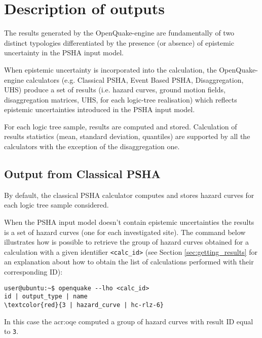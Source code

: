 \section{Description of outputs}
The results generated by the OpenQuake-engine are fundamentally 
of two distinct typologies differentiated by the presence (or 
absence) of epistemic uncertainty in the PSHA input model.

When epistemic uncertainty is incorporated into the 
calculation, the Open\-Quake\--engine calculators (e.g. Classical 
PSHA, Event Based PSHA, Disaggregation, UHS) produce a 
set of results (i.e. hazard curves, ground motion fields, 
disaggregation matrices, UHS, for each logic-tree realisation) 
which reflects epistemic 
uncertainties introduced in the PSHA input model.

For each logic tree sample, results are computed and stored. 
Calculation of results statistics (mean, standard deviation, 
quantiles) are supported by all the calculators with the exception 
of the disaggregation one.
\subsection{Output from Classical PSHA}
By default, the classical PSHA calculator computes and stores 
hazard curves for each logic tree sample considered.

When the PSHA input model doesn't contain epistemic uncertainties
the results is a set of hazard curves (one for each 
investigated site). 
The command below illustrates how is possible to retrieve the group
of hazard curves obtained for a calculation with a given
identifier \texttt{<calc\_id>} (see Section \ref{sec:getting_results}
for an explanation about how to obtain the list of calculations 
performed with their corresponding ID):
\begin{Verbatim}[frame=single, commandchars=\\\{\}, fontsize=\small]
user@ubuntu:~$ openquake --lho <calc_id>
id | output_type | name
\textcolor{red}{3 | hazard_curve | hc-rlz-6}
\end{Verbatim}
In this case the \gls{acr:oqe} computed a group of hazard curves with 
result ID equal to \texttt{3}.
 
